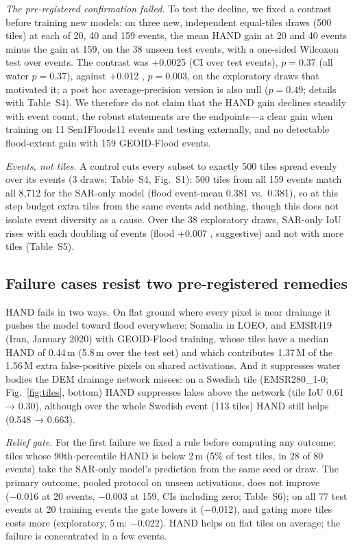 \emph{The pre-registered confirmation failed.} To test the decline, we fixed a contrast before training
new models: on three new, independent equal-tiles draws (500 tiles) at each of 20, 40 and 159 events, the
mean HAND gain at 20 and 40 events minus the gain at 159, on the 38 unseen test events, with a one-sided
Wilcoxon test over events. The contrast was +0.0025  (CI over test
events), $p = 0.37$ (all water $p = 0.37$), against +0.012 , $p = 0.003$, on the
exploratory draws that motivated it; a post hoc average-precision version is also null ($p = 0.49$; details
with Table~S4). We therefore do not claim that the HAND gain declines steadily with event count; the robust
statements are the endpoints---a clear gain when training on 11 Sen1Floods11 events and testing
externally, and no detectable flood-extent gain with 159 GEOID-Flood events.

\emph{Events, not tiles.} A control cuts every subset to exactly 500 tiles spread evenly over its events
(3 draws; Table~S4, Fig.~S1): 500 tiles from all 159 events match all 8,712 for the SAR-only model (flood
event-mean 0.381 vs.\ 0.381), so at this step budget extra tiles from the same events add nothing, though
this does not isolate event diversity as a cause. Over the 38 exploratory draws, SAR-only IoU rises with
each doubling of events (flood +0.007 , suggestive) and not with more tiles
(Table~S5).

\subsection{Failure cases resist two pre-registered remedies}
\label{sec:failures}

HAND fails in two ways. On flat ground where every pixel is near drainage it pushes the model toward flood
everywhere: Somalia in LOEO, and EMSR419 (Iran, January 2020) with GEOID-Flood training, whose tiles have a
median HAND of 0.44\,m (5.8\,m over the test set) and which contributes 1.37\,M of the 1.56\,M extra
false-positive pixels on shared activations. And it suppresses water bodies the DEM drainage network
misses: on a Swedish tile (EMSR280\_1-0; Fig.~\ref{fig:tiles}, bottom) HAND suppresses lakes above the
network (tile IoU 0.61 → 0.30), although over the whole Swedish event (113 tiles) HAND still helps (0.548 →
0.663).

\emph{Relief gate.} For the first failure we fixed a rule before computing any outcome: tiles whose
90th-percentile HAND is below 2\,m (5\% of test tiles, in 28 of 80 events) take the SAR-only model's
prediction from the same seed or draw. The primary outcome, pooled protocol \iouf{} on unseen activations,
does not improve (−0.016 at 20 events, −0.003 at 159, CIs including zero; Table~S6); on all 77 test events
at 20 training events the gate lowers it (−0.012), and gating more tiles costs more (exploratory, 5\,m:
−0.022). HAND helps on flat tiles on average; the failure is concentrated in a few events.

